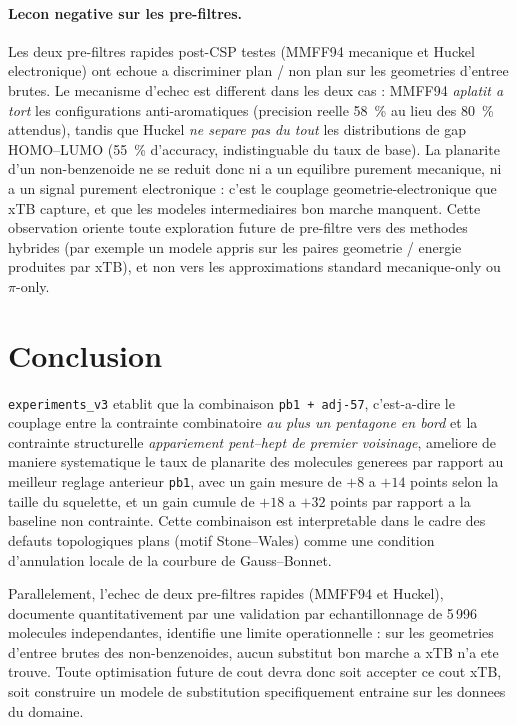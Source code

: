 \documentclass[11pt,a4paper]{article}
\begin{document}
\paragraph{Lecon negative sur les pre-filtres.}
Les deux pre-filtres rapides post-CSP testes (MMFF94 mecanique et
Huckel electronique) ont echoue a discriminer plan / non plan sur les
geometries d'entree brutes. Le mecanisme d'echec est different dans les
deux cas : MMFF94 \emph{aplatit a tort} les configurations
anti-aromatiques (precision reelle 58~\% au lieu des 80~\% attendus),
tandis que Huckel \emph{ne separe pas du tout} les distributions de
gap HOMO--LUMO (55~\% d'accuracy, indistinguable du taux de base). La
planarite d'un non-benzenoide ne se reduit donc ni a un equilibre
purement mecanique, ni a un signal purement electronique : c'est le
couplage geometrie-electronique que xTB capture, et que les modeles
intermediaires bon marche manquent. Cette observation oriente toute
exploration future de pre-filtre vers des methodes hybrides (par
exemple un modele appris sur les paires geometrie / energie produites
par xTB), et non vers les approximations standard mecanique-only ou
$\pi$-only.

\section{Conclusion}

\texttt{experiments\_v3} etablit que la combinaison \texttt{pb1 +
adj-57}, c'est-a-dire le couplage entre la contrainte combinatoire
\emph{au plus un pentagone en bord} et la contrainte structurelle
\emph{appariement pent--hept de premier voisinage}, ameliore de maniere
systematique le taux de planarite des molecules generees par rapport au
meilleur reglage anterieur \texttt{pb1}, avec un gain mesure de $+8$ a
$+14$ points selon la taille du squelette, et un gain cumule de $+18$
a $+32$ points par rapport a la baseline non contrainte. Cette
combinaison est interpretable dans le cadre des defauts topologiques
plans (motif Stone--Wales) comme une condition d'annulation locale de
la courbure de Gauss--Bonnet.

Parallelement, l'echec de deux pre-filtres rapides (MMFF94 et Huckel),
documente quantitativement par une validation par echantillonnage de
5\,996 molecules independantes, identifie une limite operationnelle :
sur les geometries d'entree brutes des non-benzenoides, aucun substitut
bon marche a xTB n'a ete trouve. Toute optimisation future de cout
devra donc soit accepter ce cout xTB, soit construire un modele de
substitution specifiquement entraine sur les donnees du domaine.
\end{document}
